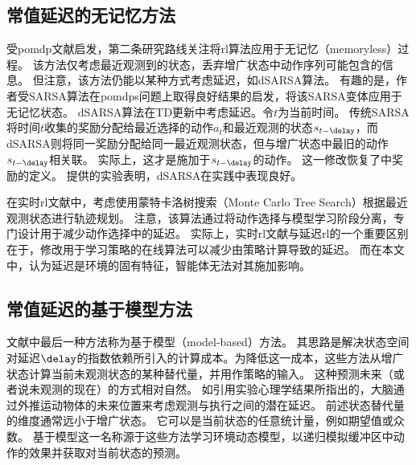 \subsection{常值延迟的无记忆方法}
\label{subsec:memoryless}
受\gls{pomdp}文献启发，第二条研究路线关注将\gls{rl}算法应用于无记忆（memoryless）过程。
该方法仅考虑最近观测到的状态，丢弃增广状态中动作序列可能包含的信息。
但注意，该方法仍能以某种方式考虑延迟，如dSARSA算法\cite{schuitema2010control}。
有趣的是，作者受SARSA算法在\glspl{pomdp}问题上取得良好结果的启发\cite{loch1998using}，将该SARSA变体\cite{rummery1994line}应用于无记忆状态。
dSARSA算法在TD更新中考虑延迟。令$t$为当前时间。
传统SARSA将时间$t$收集的奖励分配给最近选择的动作$a_t$和最近观测的状态$s_{t-\delay}$，而dSARSA则将同一奖励分配给同一最近观测状态，但与增广状态中最旧的动作$s_{t-\delay}$相关联。
实际上，这才是施加于$s_{t-\delay}$的动作。
这一修改恢复了中奖励的定义。
\cite{schuitema2010control}提供的实验表明，dSARSA在实践中表现良好。

在实时\gls{rl}文献中，\cite{hester2013texplore}考虑使用蒙特卡洛树搜索（Monte Carlo Tree Search）根据最近观测状态进行轨迹规划。
注意，该算法通过将动作选择与模型学习阶段分离，专门设计用于减少动作选择中的延迟。
实际上，实时\gls{rl}文献与延迟\gls{rl}的一个重要区别在于，修改用于学习策略的在线算法可以减少由策略计算导致的延迟\cite{hester2012rtmba,caarls2015parallel,ramstedt2019real}。
而在本文中，认为延迟是环境的固有特征，智能体无法对其施加影响。

\subsection{常值延迟的基于模型方法}
\label{subsec:model_based_related_works}
文献中最后一种方法称为基于模型（model-based）方法。
其思路是解决状态空间对延迟$\delay$的指数依赖所引入的计算成本。为降低这一成本，这些方法从增广状态计算当前未观测状态的某种替代量，并用作策略的输入。
这种预测未来（或者说未观测的现在）的方式相对自然。
如\cite{firoiu2018human}引用实验心理学结果所指出的，大脑通过外推运动物体的未来位置来考虑观测与执行之间的潜在延迟\cite{nijhawan1994motion}。
前述状态替代量的维度通常远小于增广状态。
它可以是当前状态的任意统计量，例如期望值或众数。
基于模型这一名称源于这些方法学习环境动态模型，以递归模拟缓冲区中动作的效果并获取对当前状态的预测。

